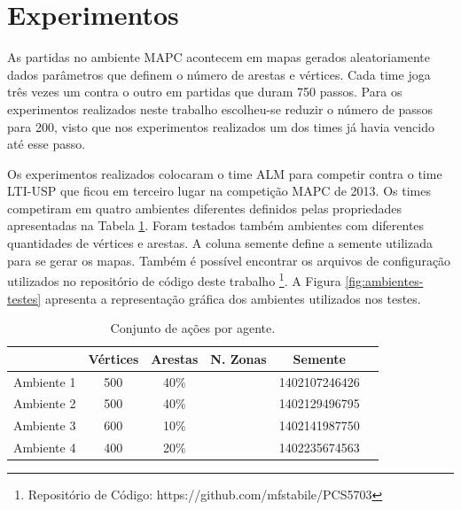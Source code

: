 \documentclass{llncs}
\begin{document}
\section{Experimentos}

As partidas no ambiente MAPC acontecem em mapas gerados aleatoriamente dados parâmetros que definem o número de arestas e vértices. Cada time joga três vezes um contra o outro em partidas que duram 750 passos. Para os experimentos realizados neste trabalho escolheu-se reduzir o número de passos para 200, visto que nos experimentos realizados um dos times já havia vencido até esse passo.

Os experimentos realizados colocaram o time ALM para competir contra o time LTI-USP que ficou em terceiro lugar na competição MAPC de 2013. Os times competiram em quatro ambientes diferentes definidos pelas propriedades apresentadas na Tabela \ref{table:ambientes}. Foram testados também ambientes com diferentes quantidades de vértices e arestas. A coluna semente define a semente utilizada para se gerar os mapas. Também é possível encontrar os arquivos de configuração utilizados no repositório de código deste trabalho \footnote{Repositório de Código: https://github.com/mfstabile/PCS5703}. A Figura \ref{fig:ambientes-testes} apresenta a representação gráfica dos ambientes utilizados nos testes.

\begin{table}[!h]
\centering
\begin{tabular}{|c|c|c|c|c|c|}
  \hline
             & Vértices & Arestas & N. Zonas &    Semente    \\ \hline
  Ambiente 1 &   500    &   40\%  &          & 1402107246426 \\ \hline
  Ambiente 2 &   500    &   40\%  &          & 1402129496795 \\ \hline
  Ambiente 3 &   600    &   10\%  &          & 1402141987750 \\ \hline
  Ambiente 4 &   400    &   20\%  &          & 1402235674563 \\ \hline
\end{tabular}
\caption{Conjunto de ações por agente.}
\label{table:ambientes}
\end{table}
\end{document}
